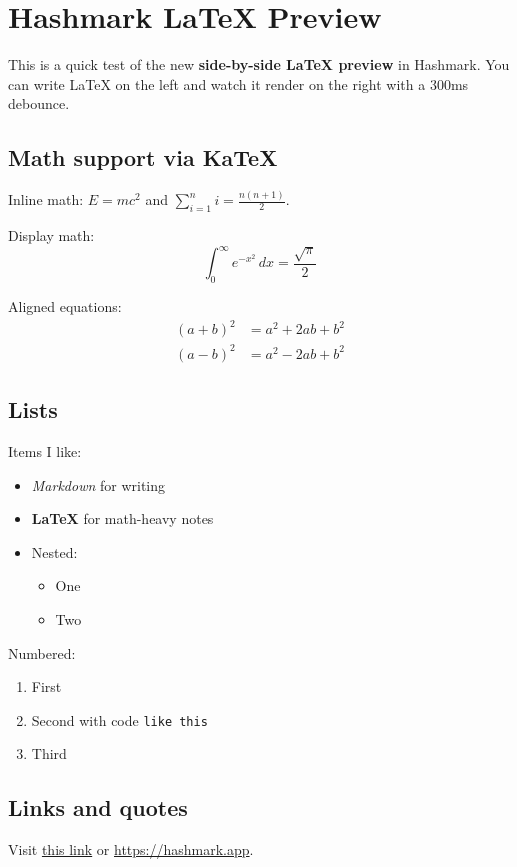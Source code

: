 \documentclass{article}
\begin{document}
\section{Hashmark LaTeX Preview}

This is a quick test of the new \textbf{side-by-side LaTeX preview} in Hashmark.
You can write LaTeX on the left and watch it render on the right with a 300ms debounce.

\subsection{Math support via KaTeX}

Inline math: $E = mc^2$ and $\sum_{i=1}^{n} i = \frac{n(n+1)}{2}$.

Display math:
\[
\int_0^\infty e^{-x^2}\, dx = \frac{\sqrt{\pi}}{2}
\]

Aligned equations:
\begin{align*}
(a+b)^2 &= a^2 + 2ab + b^2 \\
(a-b)^2 &= a^2 - 2ab + b^2
\end{align*}

\subsection{Lists}

Items I like:
\begin{itemize}
  \item \emph{Markdown} for writing
  \item \textbf{LaTeX} for math-heavy notes
  \item Nested:
  \begin{itemize}
    \item One
    \item Two
  \end{itemize}
\end{itemize}

Numbered:
\begin{enumerate}
  \item First
  \item Second with code \texttt{like this}
  \item Third
\end{enumerate}

\subsection{Links and quotes}

Visit \href{https://example.com}{this link} or \url{https://hashmark.app}.
\end{document}
